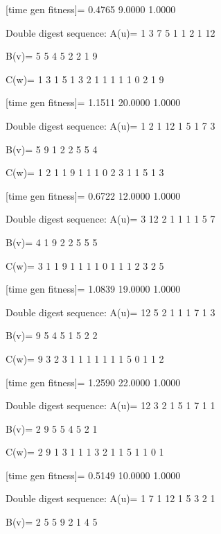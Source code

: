 [time gen fitness]=
    0.4765    9.0000    1.0000

Double digest sequence:
A(u)=
     1     3     7     5     1     1     2     1    12

B(v)=
     5     5     4     5     2     2     1     9

C(w)=
     1     3     1     5     1     3     2     1     1     1     1     1     0     2     1     9

[time gen fitness]=
    1.1511   20.0000    1.0000

Double digest sequence:
A(u)=
     1     2     1    12     1     5     1     7     3

B(v)=
     5     9     1     2     2     5     5     4

C(w)=
     1     2     1     1     9     1     1     1     0     2     3     1     1     5     1     3

[time gen fitness]=
    0.6722   12.0000    1.0000

Double digest sequence:
A(u)=
     3    12     2     1     1     1     1     5     7

B(v)=
     4     1     9     2     2     5     5     5

C(w)=
     3     1     1     9     1     1     1     1     0     1     1     1     2     3     2     5

[time gen fitness]=
    1.0839   19.0000    1.0000

Double digest sequence:
A(u)=
    12     5     2     1     1     1     7     1     3

B(v)=
     9     5     4     5     1     5     2     2

C(w)=
     9     3     2     3     1     1     1     1     1     1     1     5     0     1     1     2

[time gen fitness]=
    1.2590   22.0000    1.0000

Double digest sequence:
A(u)=
    12     3     2     1     5     1     7     1     1

B(v)=
     2     9     5     5     4     5     2     1

C(w)=
     2     9     1     3     1     1     1     3     2     1     1     5     1     1     0     1

[time gen fitness]=
    0.5149   10.0000    1.0000

Double digest sequence:
A(u)=
     1     7     1    12     1     5     3     2     1

B(v)=
     2     5     5     9     2     1     4     5

